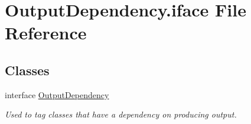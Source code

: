\hypertarget{OutputDependency_8iface}{\section{Output\-Dependency.\-iface File Reference}
\label{OutputDependency_8iface}
}
\subsection*{Classes}
\begin{DoxyCompactItemize}
\item 
interface \hyperlink{interfaceOutputDependency}{Output\-Dependency}
\begin{DoxyCompactList}\small\item\em Used to tag classes that have a dependency on producing output. \end{DoxyCompactList}\end{DoxyCompactItemize}
